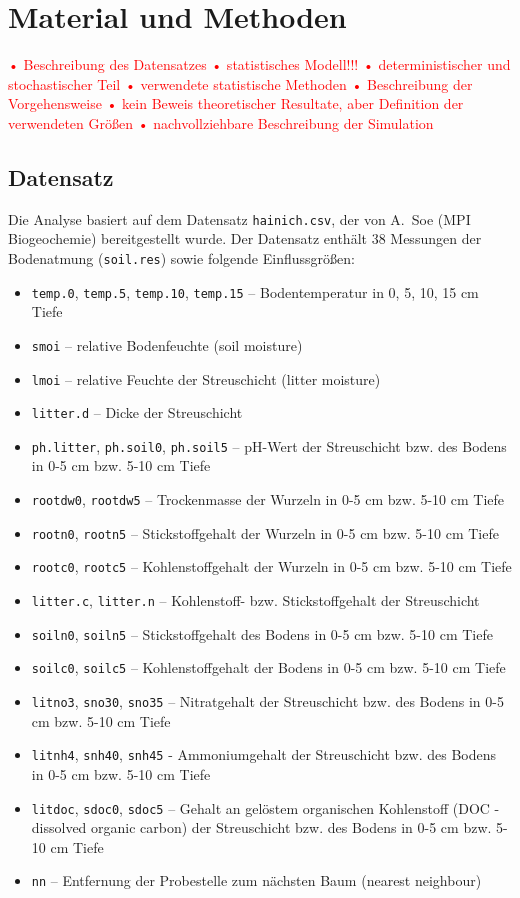 \section{Material und Methoden}
\textcolor{red}{• Beschreibung des Datensatzes • statistisches Modell!!!
• deterministischer und stochastischer Teil
• verwendete statistische Methoden
• Beschreibung der Vorgehensweise
• kein Beweis theoretischer Resultate, aber Definition der verwendeten Größen
• nachvollziehbare Beschreibung der Simulation}

\subsection{Datensatz}

Die Analyse basiert auf dem Datensatz \texttt{hainich.csv}, der von A.~Soe (MPI Biogeochemie)
bereitgestellt wurde. Der Datensatz enthält 38 Messungen der Bodenatmung (\texttt{soil.res}) sowie
folgende Einflussgrößen:

\begin{itemize}
\setlength{\itemsep}{0pt}
\item \texttt{temp.0}, \texttt{temp.5}, \texttt{temp.10}, \texttt{temp.15} – Bodentemperatur in 0, 5, 10, 15 cm Tiefe
\item \texttt{smoi} – relative Bodenfeuchte (soil moisture)
\item \texttt{lmoi} – relative Feuchte der Streuschicht (litter moisture)
\item \texttt{litter.d} – Dicke der Streuschicht
\item \texttt{ph.litter}, \texttt{ph.soil0}, \texttt{ph.soil5} – pH-Wert der Streuschicht bzw. des Bodens in 0-5 cm bzw. 5-10 cm Tiefe
\item \texttt{rootdw0}, \texttt{rootdw5} – Trockenmasse der Wurzeln in 0-5 cm bzw. 5-10 cm Tiefe
\item \texttt{rootn0}, \texttt{rootn5} – Stickstoffgehalt der Wurzeln in 0-5 cm bzw. 5-10 cm Tiefe
\item \texttt{rootc0}, \texttt{rootc5} – Kohlenstoffgehalt der Wurzeln in 0-5 cm bzw. 5-10 cm Tiefe
\item \texttt{litter.c}, \texttt{litter.n} – Kohlenstoff- bzw. Stickstoffgehalt der Streuschicht
\item \texttt{soiln0}, \texttt{soiln5} – Stickstoffgehalt des Bodens in 0-5 cm bzw. 5-10 cm Tiefe
\item \texttt{soilc0}, \texttt{soilc5} – Kohlenstoffgehalt der Bodens in 0-5 cm bzw. 5-10 cm Tiefe
\item \texttt{litno3}, \texttt{sno30}, \texttt{sno35} – Nitratgehalt der Streuschicht bzw. des Bodens in 0-5 cm bzw. 5-10 cm Tiefe
\item \texttt{litnh4}, \texttt{snh40}, \texttt{snh45} - Ammoniumgehalt der Streuschicht bzw. des Bodens in 0-5 cm bzw. 5-10 cm Tiefe
\item \texttt{litdoc}, \texttt{sdoc0}, \texttt{sdoc5} – Gehalt an gelöstem organischen Kohlenstoff (DOC - dissolved organic carbon) der Streuschicht bzw. des Bodens in 0-5 cm bzw. 5-10 cm Tiefe
\item \texttt{nn} – Entfernung der Probestelle zum nächsten Baum (nearest neighbour)
\end{itemize}

